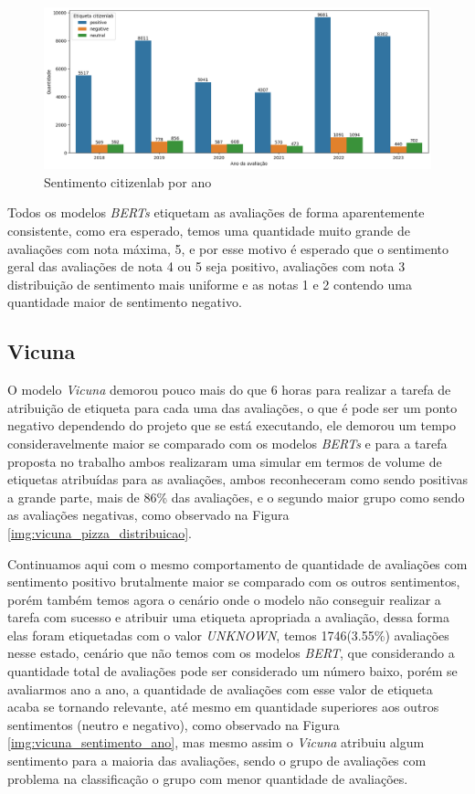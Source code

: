 \begin{figure}
	\centering
	\includegraphics[width=1\textwidth]{figs/bert/classificacao_citizenlab.png}
	\caption{Sentimento citizenlab por ano}
	\label{img:sentimento_citizenlab}
\end{figure}


Todos os modelos \textit{BERTs} etiquetam as avaliações de forma aparentemente consistente, como era esperado, temos uma quantidade muito grande de avaliações com nota máxima, 5, e por esse motivo é esperado que o sentimento geral das avaliações de nota 4 ou 5 seja positivo, avaliações com nota 3 distribuição de sentimento mais uniforme e as notas 1 e 2 contendo uma quantidade maior de sentimento negativo.

\subsection{Vicuna}
\label{sec:resultados:subsec:vicuna}


O modelo \textit{Vicuna} demorou pouco mais do que 6 horas para realizar a tarefa de atribuição de etiqueta para cada uma das avaliações, o que é pode ser um ponto negativo dependendo do projeto que se está executando, ele demorou um tempo consideravelmente maior se comparado com os modelos \textit{BERTs} e para a tarefa proposta no trabalho ambos realizaram uma simular em termos de volume de etiquetas atribuídas para as avaliações, ambos reconheceram como sendo positivas a grande parte, mais de 86\% das avaliações, e o segundo maior grupo como sendo as avaliações negativas, como observado na Figura \ref{img:vicuna_pizza_distribuicao}.

Continuamos aqui com o mesmo comportamento de quantidade de avaliações com sentimento positivo brutalmente maior se comparado com os outros sentimentos, porém também temos agora o cenário onde o modelo não conseguir realizar a tarefa com sucesso e atribuir uma etiqueta apropriada a avaliação, dessa forma elas foram etiquetadas com o valor \textit{UNKNOWN}, temos 1746(3.55\%) avaliações nesse estado, cenário que não temos com os modelos \textit{BERT}, que considerando a quantidade total de avaliações pode ser considerado um número baixo, porém se avaliarmos ano a ano, a quantidade de avaliações com esse valor de etiqueta acaba se tornando relevante, até mesmo em quantidade superiores aos outros sentimentos (neutro e negativo), como observado na Figura \ref{img:vicuna_sentimento_ano}, mas mesmo assim o \textit{Vicuna} atribuiu algum sentimento para a maioria das avaliações, sendo o grupo de avaliações com problema na classificação o grupo com menor quantidade de avaliações.

